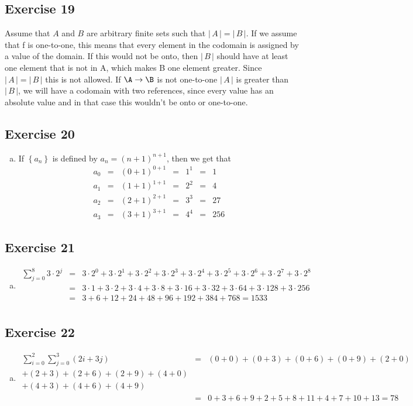\documentclass[a4paper]{article}
\newcommand{\exercise}[2]{\subsection*{Exercise #1}{#2}}
\newcommand{\exerciseenum}[2]{\subsection*{Exercise #1}{\begin{enumerate}[a)]#2\end{enumerate}}}
\newcommand{\abs}[1]{\ensuremath{\left|\, #1 \,\right|}}
\newcommand{\seq}[1]{\ensuremath{\left\{{#1}\right\}}}
\begin{document}
\exercise{19}{%
Assume that $A$ and $B$ are arbitrary finite sets such that $\abs{A}=\abs{B}$.
If we assume that f is one-to-one, this means that every element in the codomain is assigned by a value of the domain. If this would not be onto, then $\abs{B}$ should have at least one element that is not in A, which makes B one element greater. Since $\abs{A} = \abs{B}$ this is not allowed. If $\A\to\B$ is not one-to-one $\abs{A}$ is greater than $\abs{B}$, we will have a codomain with two references, since every value has an absolute value and in that case this wouldn't be onto or one-to-one.
}

\exerciseenum{20}{%
\addtocounter{enumi}{1}
\item%
If $\seq{a_n}$ is defined by $a_n=(n + 1)^{n+1}$, then we get that
\[
\begin{array}{rclclclcl}
a_0 &=& (0 + 1)^{0+1} &=& 1^1 &=& 1 \\
a_1 &=& (1 + 1)^{1+1} &=& 2^2 &=& 4 \\
a_2 &=& (2 + 1)^{2+1} &=& 3^3 &=& 27 \\
a_3 &=& (3 + 1)^{3+1} &=& 4^4 &=& 256
\end{array}
\]
}

\exerciseenum{21}{%
\item%
\begin{eqnarray*}
\displaystyle
\sum_{j=0}^8 3 \cdot 2^j
  &=& 3 \cdot 2^0 + 3 \cdot 2^1 + 3 \cdot 2^2 + 3 \cdot 2^3 + 3 \cdot 2^4 + 3 \cdot 2^5 + 3 \cdot 2^6 + 3 \cdot 2^7 + 3 \cdot 2^8\\
  &=& 3 \cdot 1 + 3 \cdot 2 + 3 \cdot 4 + 3 \cdot 8 + 3 \cdot 16 + 3 \cdot 32 + 3 \cdot 64 + 3 \cdot 128 + 3 \cdot 256 \\
  &=& 3 + 6 + 12 + 24 + 48 + 96 + 192 + 384 + 768 = 1533  \\
\end{eqnarray*}
}

\newpage
\exerciseenum{22}{%
\addtocounter{enumi}{1}
\item%
\begin{eqnarray*}
\displaystyle
\sum_{i=0}^2 \sum_{j=0}^3 (2i+3j)
  &=& (0 + 0) + (0 + 3) + (0 + 6) + (0 + 9) + (2 + 0)\\ + (2 + 3) + (2 + 6) + (2 + 9) + (4 + 0)\\ + (4 + 3) + (4 + 6) + (4 + 9)\\
  &=& 0 + 3 + 6 + 9 + 2 + 5 + 8 + 11 + 4 + 7 + 10 + 13 = 78 \\
\end{eqnarray*}
}
\end{document}
